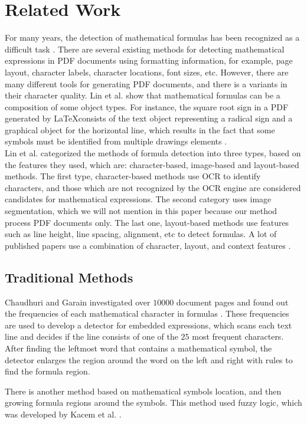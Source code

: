 \section{Related Work}
For many years, the detection of mathematical formulas has been recognized as a difficult task \cite{Chan2000}. There are several existing methods for detecting mathematical expressions in PDF documents using formatting information, for example, page layout, character labels, character locations, font sizes, etc.  However, there are many different tools for generating PDF documents, and there is a variants in their character quality. Lin et al. \cite{Lin2011} show that mathematical formulas can be a composition of some object types. For instance, the square root sign in a PDF generated by \LaTeX consists of the text object representing a radical sign and a graphical object for the horizontal line, which results in the fact that some symbols must be identified from multiple drawings elements \cite{Mali2020}. \\
Lin et al. \cite{Lin2011} categorized the methods of formula detection into three types, based on the features they used, which are: character-based, image-based and layout-based methods. The first type, character-based methods use OCR to identify characters, and those which are not recognized by the OCR engine are considered candidates for mathematical expressions. The second category uses image segmentation, which we will not mention in this paper because our method process PDF documents only. The last one, layout-based methods use features such as line height, line spacing, alignment, etc to detect formulas. A lot of published papers use a combination of character, layout, and context features
\cite{Mali2020}.

\subsection{Traditional Methods}
Chaudhuri and Garain investigated over $10000$ document pages and found out the frequencies of each mathematical character in formulas \cite{Chaudhuri1998AnAF}. These frequencies are used to develop a detector for embedded expressions, which scans each text line and decides if the line consists of one of the $25$ most frequent characters. After finding the leftmost word that contains a mathematical symbol, the detector enlarges the region around the word on the left and right with rules to find the formula region.


There is another method based on mathematical symbols location, and then growing formula regions around the symbols. This method used fuzzy logic, which was developed by Kacem et al. \cite{Kacem2001}.

